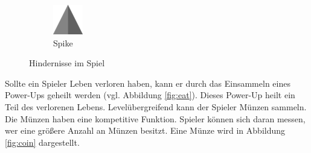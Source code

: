 \begin{figure}[H]
\begin{subfigure}[H]{0.15\textwidth}
        \includegraphics[width=\textwidth]{img/realisierung/assets/spike}
        \caption{Spike}
        \label{fig:spike}
    \end{subfigure}
    \caption{Hindernisse im Spiel}
    \label{fig:maceandspike}
\end{figure}

Sollte ein Spieler Leben verloren haben, kann er durch das Einsammeln eines Power-Ups geheilt werden (vgl. Abbildung \ref{fig:eat}). Dieses Power-Up heilt ein Teil des verlorenen Lebens. 
Levelübergreifend kann der Spieler Münzen sammeln. Die Münzen haben eine kompetitive Funktion. Spieler können sich daran messen, wer eine größere Anzahl an Münzen besitzt. Eine Münze wird in Abbildung \ref{fig:coin} dargestellt.

